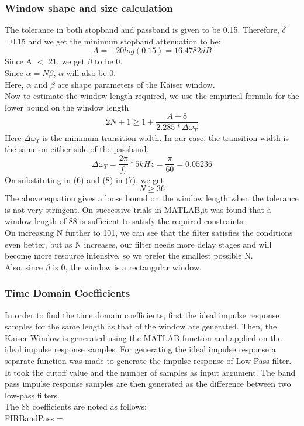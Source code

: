 \documentclass[12pt]{article}
\begin{document}
\subsubsection{Window shape and size calculation}
The tolerance in both stopband and passband is given to be 0.15.
Therefore, $\delta$=0.15 and we get the minimum stopband attenuation to be:
\begin{equation}
    A=-20log(0.15)=16.4782dB
\end{equation}
Since A $<$ 21, we get $\beta$ to be 0.
\\Since $\alpha = N\beta $, $\alpha$ will also be 0.
\\Here, $\alpha$ and $\beta$ are shape parameters of the Kaiser window.
\\Now to estimate the window length required, we use the empirical formula for the lower bound
on the window length
\begin{equation}
    2N+1 \geq 1+\frac{A-8}{2.285*\Delta\omega_T}
\end{equation}
Here $\Delta\omega_T$ is the minimum transition width. In our case, the transition width is the same on either
side of the passband.
\begin{equation}
    \Delta\omega_T=\frac{2\pi}{f_s} * 5kHz= \frac{\pi}{60}=0.05236
\end{equation}
On substituting in (6) and (8) in (7), we get
\begin{equation}
    N \geq 36
\end{equation}
The above equation gives a loose bound on the window length when the tolerance is not very
stringent. 
On successive trials in MATLAB,it was found that a window length of 88 is sufficient to satisfy
the required constraints.
\\On increasing N further to 101, we can see that the filter satisfies the conditions even better, but as N increases, our filter needs more delay stages and will become more resource intensive, so we prefer the smallest possible N.
\\Also, since $\beta$ is 0, the window is a
rectangular window.
\subsubsection{Time Domain Coefficients}
In order to find the time domain coefficients, first the ideal impulse response samples for the
same length as that of the window are generated. Then, the Kaiser Window is generated using
the MATLAB function and applied on the ideal impulse response samples. For generating the ideal
impulse response a separate function was made to generate the impulse response of Low-Pass
filter. It took the cutoff value and the number of samples as input argument. The band pass
impulse response samples are then generated as the difference between two low-pass filters.
\\The 88 coefficients are noted as follows:
\\FIRBandPass =
\end{document}
